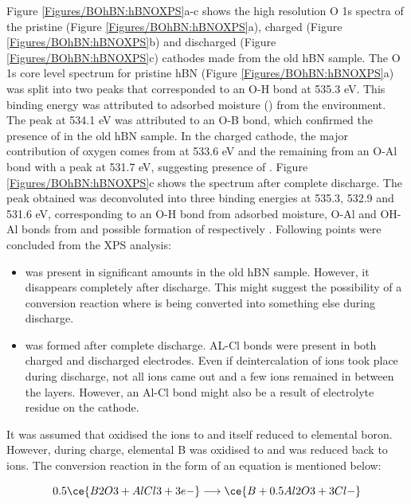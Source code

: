 Figure \ref{Figures/BOhBN:hBNOXPS}a-c shows the high resolution O 1s spectra of the pristine (Figure \ref{Figures/BOhBN:hBNOXPS}a), charged (Figure \ref{Figures/BOhBN:hBNOXPS}b) and discharged (Figure \ref{Figures/BOhBN:hBNOXPS}c) cathodes made from the old hBN sample. The O 1s core level spectrum for pristine hBN (Figure \ref{Figures/BOhBN:hBNOXPS}a) was split into two peaks that corresponded to an O-H bond at 535.3 eV. This binding energy was attributed to adsorbed moisture () from the environment. The peak at 534.1 eV was attributed to an O-B bond, which confirmed the presence of  in the old hBN sample. In the charged cathode, the major contribution of oxygen comes from  at 533.6 eV and the remaining from an O-Al bond with a peak at 531.7 eV, suggesting presence of .  Figure \ref{Figures/BOhBN:hBNOXPS}c shows the spectrum after complete discharge. The peak obtained was deconvoluted into three binding energies at 535.3, 532.9 and 531.6 eV, corresponding to an O-H bond from adsorbed moisture, O-Al and OH-Al bonds from  and possible formation of  respectively \cite{}. Following points were concluded from the XPS analysis:
\begin{itemize}
    \item {} was present in significant amounts in the old hBN sample. However, it disappears completely after discharge. This might suggest the possibility of a conversion reaction where  is being converted into something else during discharge.  
    \item {} was formed after complete discharge. AL-Cl bonds were present in both charged and discharged electrodes. Even if deintercalation of ions took place during discharge, not all ions came out and a few  ions remained in between the layers. However, an Al-Cl bond might also be a result of electrolyte residue on the cathode. 
\end{itemize}

It was assumed that  oxidised the  ions to  and itself reduced to elemental boron. However, during charge, elemental B was oxidised to  and  was reduced back to  ions. The conversion reaction in the form of an equation is mentioned below: 

\begin{equation}
    0.5\ce{B2O3 + AlCl3 + 3e-} \longrightarrow \ce{B + 0.5Al2O3 + 3Cl-}
\end{equation}

